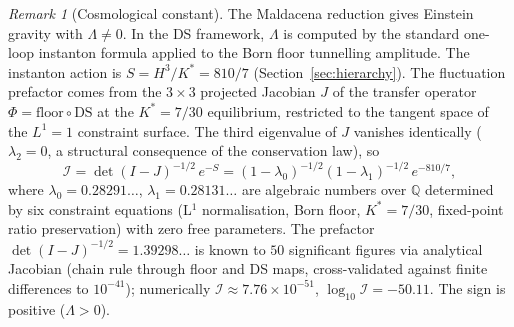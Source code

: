 \documentclass[11pt,a4paper]{article}
\theoremstyle{definition}
\theoremstyle{remark}
\newtheorem{remark}[theorem]{Remark}
\begin{document}
\begin{remark}[Cosmological constant]\label{rem:cc}
The Maldacena reduction gives Einstein gravity with $\Lambda\neq 0$. In the DS framework, $\Lambda$ is computed by the standard one-loop instanton formula applied to the Born floor tunnelling amplitude. The instanton action is $S=H^3/K^*=810/7$ (Section~\ref{sec:hierarchy}). The fluctuation prefactor comes from the $3\times 3$ projected Jacobian $J$ of the transfer operator $\Phi=\mathrm{floor}\circ\mathrm{DS}$ at the $K^*=7/30$ equilibrium, restricted to the tangent space of the $L^1=1$ constraint surface. The third eigenvalue of $J$ vanishes identically ($\lambda_2=0$, a structural consequence of the conservation law), so
\begin{equation}\label{eq:instanton}
\mathcal{I}=\det(I-J)^{-1/2}\,e^{-S}=(1-\lambda_0)^{-1/2}(1-\lambda_1)^{-1/2}\,e^{-810/7},
\end{equation}
where $\lambda_0=0.28291\ldots$, $\lambda_1=0.28131\ldots$ are algebraic numbers over $\mathbb{Q}$ determined by six constraint equations (L$^1$ normalisation, Born floor, $K^*=7/30$, fixed-point ratio preservation) with zero free parameters. The prefactor $\det(I-J)^{-1/2}=1.39298\ldots$ is known to $50$ significant figures via analytical Jacobian (chain rule through floor and DS maps, cross-validated against finite differences to $10^{-41}$); numerically $\mathcal{I}\approx 7.76\times 10^{-51}$, $\log_{10}\mathcal{I}=-50.11$. The sign is positive ($\Lambda>0$).


\end{remark}
\end{document}
